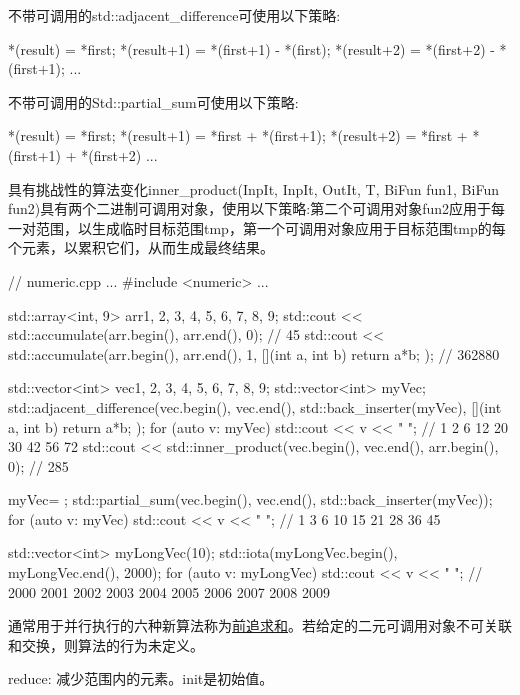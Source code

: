 不带可调用的std::adjacent\_difference可使用以下策略:

\begin{cpp}
*(result) = *first;
*(result+1) = *(first+1) - *(first);
*(result+2) = *(first+2) - *(first+1);
...
\end{cpp}

不带可调用的Std::partial\_sum可使用以下策略:

\begin{cpp}
*(result) = *first;
*(result+1) = *first + *(first+1);
*(result+2) = *first + *(first+1) + *(first+2)
...
\end{cpp}

具有挑战性的算法变化inner\_product(InpIt, InpIt, OutIt, T, BiFun fun1, BiFun fun2)具有两个二进制可调用对象，使用以下策略:第二个可调用对象fun2应用于每一对范围，以生成临时目标范围tmp，第一个可调用对象应用于目标范围tmp的每个元素，以累积它们，从而生成最终结果。


\begin{cpp}
// numeric.cpp
...
#include <numeric>
...

std::array<int, 9> arr{1, 2, 3, 4, 5, 6, 7, 8, 9};
std::cout << std::accumulate(arr.begin(), arr.end(), 0); // 45
std::cout << std::accumulate(arr.begin(), arr.end(), 1,
							 [](int a, int b){ return a*b; } ); // 362880

std::vector<int> vec{1, 2, 3, 4, 5, 6, 7, 8, 9};
std::vector<int> myVec;
std::adjacent_difference(vec.begin(), vec.end(),
				std::back_inserter(myVec), [](int a, int b){ return a*b; });
for (auto v: myVec) std::cout << v << " "; // 1 2 6 12 20 30 42 56 72
std::cout << std::inner_product(vec.begin(), vec.end(), arr.begin(), 0); // 285

myVec= {};
std::partial_sum(vec.begin(), vec.end(), std::back_inserter(myVec));
for (auto v: myVec) std::cout << v << " "; // 1 3 6 10 15 21 28 36 45

std::vector<int> myLongVec(10);
std::iota(myLongVec.begin(), myLongVec.end(), 2000);
for (auto v: myLongVec) std::cout << v << " ";
						// 2000 2001 2002 2003 2004 2005 2006 2007 2008 2009
\end{cpp}


通常用于并行执行的六种新算法称为\href{https://en.wikipedia.org/wiki/Prefix_sum}{前追求和}。若给定的二元可调用对象不可关联和交换，则算法的行为未定义。

reduce: 减少范围内的元素。init是初始值。

